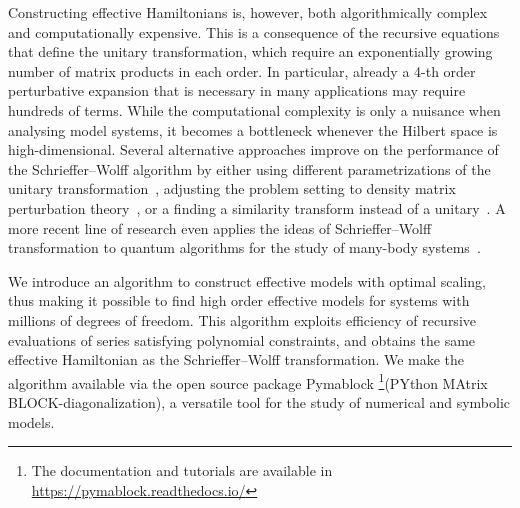 Constructing effective Hamiltonians is, however, both algorithmically complex and computationally expensive.
This is a consequence of the recursive equations that define the unitary transformation, which require an exponentially growing number of matrix products in each order.
In particular, already a 4-th order perturbative expansion that is necessary in many applications may require hundreds of terms.
While the computational complexity is only a nuisance when analysing model systems, it becomes a bottleneck whenever the Hilbert space is high-dimensional.
Several alternative approaches improve on the performance of the Schrieffer--Wolff algorithm by either using different parametrizations of the unitary transformation~\cite{Van_Vleck_1929, Shavitt_1980, Lowdin_1962, Klein_1974, Suzuki_1983}, adjusting the problem setting to density matrix perturbation theory~\cite{McWeeny_1962, Truflandier_2020}, or a finding a similarity transform instead of a unitary~\cite{Bloch_1958}.
A more recent line of research even applies the ideas of Schrieffer--Wolff transformation to quantum algorithms for the study of many-body systems~\cite{Wurtz_2020, Zhang_2022}.

We introduce an algorithm to construct effective models with optimal scaling, thus making it possible to find high order effective models for systems with millions of degrees of freedom.
This algorithm exploits efficiency of recursive evaluations of series satisfying polynomial constraints, and obtains the same effective Hamiltonian as the Schrieffer--Wolff transformation.
We make the algorithm available via the open source package Pymablock \footnote{The documentation and tutorials are available in \url{https://pymablock.readthedocs.io/}}(PYthon MAtrix BLOCK-diagonalization), a versatile tool for the study of numerical and symbolic models.
